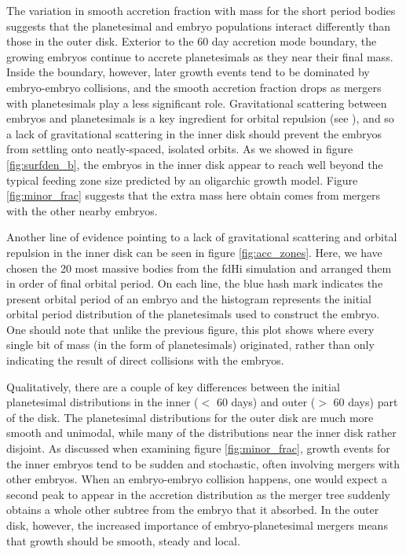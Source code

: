 \documentclass[twocolumn,linenumbers]{aastex63}
\begin{document}
The variation in smooth accretion fraction with mass for the short period bodies suggests that the planetesimal and embryo populations interact differently than those in the outer disk. Exterior to the 60 day accretion mode boundary, the growing embryos continue to accrete planetesimals as they near their final mass. Inside the boundary, however, later growth events tend to be dominated by embryo-embryo collisions, and the smooth accretion fraction drops as mergers with planetesimals play a less significant role. Gravitational scattering between embryos and planetesimals is a key ingredient for orbital repulsion (see \citet{kokubo98}), and so a lack of gravitational scattering in the inner disk should prevent the embryos from settling onto neatly-spaced, isolated orbits. As we showed in figure \ref{fig:surfden_b}, the embryos in the inner disk appear to reach well beyond the typical feeding zone size predicted by an oligarchic growth model. Figure \ref{fig:minor_frac} suggests that the extra mass here obtain comes from mergers with the other nearby embryos.

Another line of evidence pointing to a lack of gravitational
scattering and orbital repulsion in the inner disk can be seen in
figure \ref{fig:acc_zones}. Here, we have chosen the 20 most massive
bodies from the fdHi simulation and arranged them in order of final
orbital period. On each line, the blue
hash mark indicates the present orbital period of an embryo and the histogram represents the initial orbital period distribution of the planetesimals used to construct the embryo. One should note that unlike the previous figure, this plot shows where every single bit of mass (in the form of planetesimals) originated, rather than only indicating the result of direct collisions with the embryos.

Qualitatively, there are a couple of key differences between the initial planetesimal distributions in the inner ($<$ 60 days) and outer ($>$ 60 days) part of the disk. The planetesimal distributions for the outer disk are much more smooth and unimodal, while many of the distributions near the inner disk rather disjoint. As discussed when examining figure \ref{fig:minor_frac}, growth events for the inner embryos tend to be sudden and stochastic, often involving mergers with other embryos. When an embryo-embryo collision happens, one would expect a second peak to appear in the accretion distribution as the merger tree suddenly obtains a whole other subtree from the embryo that it absorbed. In the outer disk, however, the increased importance of embryo-planetesimal mergers means that growth should be smooth, steady and local.
\end{document}
